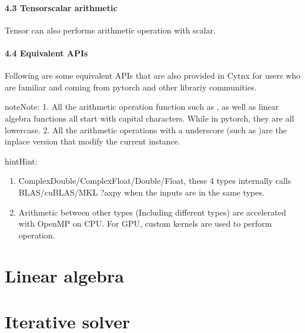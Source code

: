 \documentclass[letterpaper,10pt,english]{sphinxmanual}
\begin{document}
\paragraph{4.3 Tensor\sphinxhyphen{}scalar arithmetic}
\label{\detokenize{guide/basic_obj/Tensor_4_arithmetic:tensor-scalar-arithmetic}}
Tensor can also performs arithmetic operation with scalar.


\paragraph{4.4 Equivalent APIs}
\label{\detokenize{guide/basic_obj/Tensor_4_arithmetic:equivalent-apis}}
Following are some equivalent APIs that  are also provided in Cytnx for users who are familiar and coming from pytorch and other librariy communities.

\begin{sphinxadmonition}{note}{Note:}
1. All the arithmetic operation function such as , as well as linear algebra functions all start with capital characters.
While in pytorch, they are all lower\sphinxhyphen{}case.
2. All the arithmetic operations with a underscore (such as )are the inplace version that modify the current instance.
\end{sphinxadmonition}

\begin{sphinxadmonition}{hint}{Hint:}\begin{enumerate}
%
\item {} 
ComplexDouble/ComplexFloat/Double/Float, these 4 types internally calls BLAS/cuBLAS/MKL ?axpy when the inputs are in the same types.

\item {} 
Arithmetic between other types (Including different types) are accelerated with OpenMP on CPU. For GPU, custom kernels are used to perform operation.

\end{enumerate}
\end{sphinxadmonition}


\section{Linear algebra}
\label{\detokenize{guide/linalg:linear-algebra}}\label{\detokenize{guide/linalg::doc}}

\section{Iterative solver}
\label{\detokenize{guide/itersol:iterative-solver}}\label{\detokenize{guide/itersol::doc}}
\end{document}
